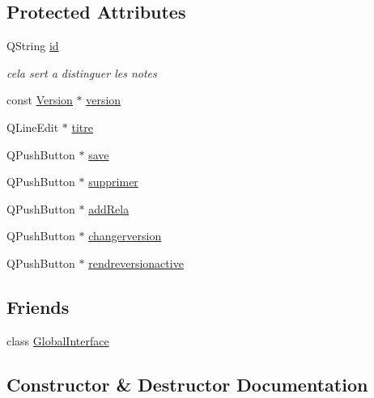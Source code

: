 \subsection*{Protected Attributes}
\begin{DoxyCompactItemize}
\item 
Q\+String \hyperlink{classNoteInterfaceEditable_a644ed9be4e9882c784a2667748d8501d}{id}
\begin{DoxyCompactList}\small\item\em cela sert a distinguer les notes \end{DoxyCompactList}\item 
const \hyperlink{classVersion}{Version} $\ast$ \hyperlink{classNoteInterfaceEditable_a675dc96abf62ead999fa4b62a0fed1e9}{version}
\item 
Q\+Line\+Edit $\ast$ \hyperlink{classNoteInterfaceEditable_a3f0e84bb4240af488e1d8feea5c33a0a}{titre}
\item 
Q\+Push\+Button $\ast$ \hyperlink{classNoteInterfaceEditable_aa87cefbc14f5b64c8f1fc7be82afbd5f}{save}
\item 
Q\+Push\+Button $\ast$ \hyperlink{classNoteInterfaceEditable_a2f059a66b8085ec4f7d617288555f466}{supprimer}
\item 
Q\+Push\+Button $\ast$ \hyperlink{classNoteInterfaceEditable_a9227ecdcb24b1d03527a393c28b4ac82}{add\+Rela}
\item 
Q\+Push\+Button $\ast$ \hyperlink{classNoteInterfaceEditable_a1f6857538729da4a3db98812a96f4865}{changerversion}
\item 
Q\+Push\+Button $\ast$ \hyperlink{classNoteInterfaceEditable_aa46c12ebba924982ed12a3eb53c97be4}{rendreversionactive}
\end{DoxyCompactItemize}
\subsection*{Friends}
\begin{DoxyCompactItemize}
\item 
class \hyperlink{classNoteInterfaceEditable_a2250a78aa5cceb79c3e34da3f1fe0fde}{Global\+Interface}
\end{DoxyCompactItemize}


\subsection{Constructor \& Destructor Documentation}
